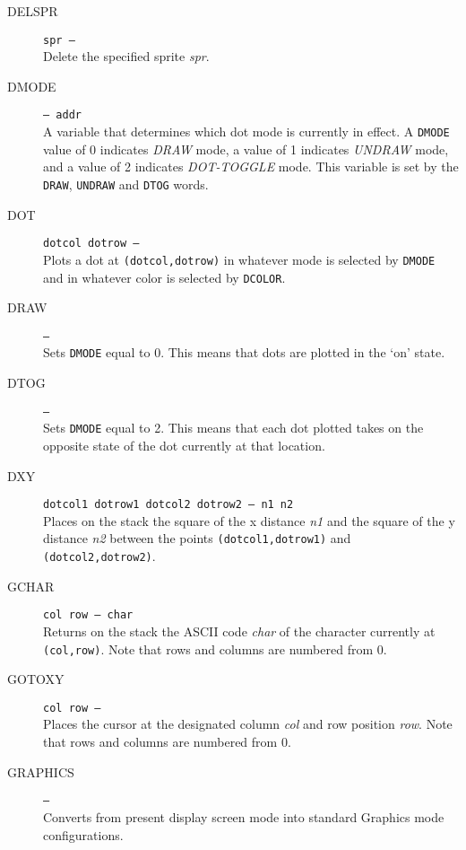 \documentclass{article}
\begin{document}
\begin{multicols}{2}[]
\begin{description}
			\item[DELSPR]\texttt{spr --- }\\
				Delete the specified sprite \textit{spr}.

			\item[DMODE]\texttt{--- addr }\\
				A variable that determines which dot mode is currently in effect.
				A \verb|DMODE| value of 0 indicates \textit{DRAW} mode, a value of 1
				indicates \textit{UNDRAW} mode, and a value of 2 indicates
				\textit{DOT-TOGGLE} mode. This variable is set by the \verb|DRAW|,
				\verb|UNDRAW| and \verb|DTOG| words.

			\item[DOT]\texttt{dotcol dotrow --- }\\
				Plots a dot at \verb|(dotcol,dotrow)| in whatever mode is selected
				by \verb|DMODE| and in whatever color is selected by \verb|DCOLOR|.

			\item[DRAW]\texttt{--- }\\
				Sets \verb|DMODE| equal to 0. This means that dots are plotted in
				the `on' state.

			\item[DTOG]\texttt{--- }\\
				Sets \verb|DMODE| equal to 2. This means that each dot plotted
				takes on the opposite state of the dot currently at that location.

			\item[DXY]\texttt{dotcol1 dotrow1 dotcol2 dotrow2 --- n1 n2 }\\
				Places on the stack the square of the x distance \textit{n1} and
				the square of the y distance \textit{n2} between the points
				\verb|(dotcol1,dotrow1)| and \verb|(dotcol2,dotrow2)|.

			\item[GCHAR]\texttt{col row --- char }\\
				Returns on the stack the ASCII code \textit{char} of the character
				currently at \verb|(col,row)|. Note that rows and columns are
				numbered from 0.

			\item[GOTOXY]\texttt{col row --- }\\
				Places the cursor at the designated column \textit{col} and row
				position \textit{row}. Note that rows and columns are numbered
				from 0.

			\item[GRAPHICS]\texttt{--- }\\
				Converts from present display screen mode into standard Graphics mode
				configurations.


\end{description}
\end{multicols}
\end{document}
